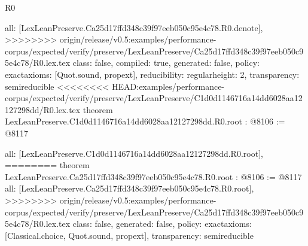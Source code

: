 \begin{lexlean}{R0}
\begin{coremodule}
{{{{{  all: [LexLeanPreserve.Ca25d17ffd348c39f97eeb050c95e4c78.R0.denote],
>>>>>>>> origin/release/v0.5:examples/performance-corpus/expected/verify/preserve/LexLeanPreserve/Ca25d17ffd348c39f97eeb050c95e4c78/R0.lex.tex
  class: false,
  compiled: true,
  generated: false,
  policy: exact{axioms: [Quot.sound, propext]},
  reducibility: regular{height: 2},
  transparency: semireducible
}
<<<<<<<< HEAD:examples/performance-corpus/expected/verify/preserve/LexLeanPreserve/C1d0d1146716a14dd6028aa12127298dd/R0.lex.tex
theorem LexLeanPreserve.C1d0d1146716a14dd6028aa12127298dd.R0.root : @8106 := @8117 {
  all: [LexLeanPreserve.C1d0d1146716a14dd6028aa12127298dd.R0.root],
========
theorem LexLeanPreserve.Ca25d17ffd348c39f97eeb050c95e4c78.R0.root : @8106 := @8117 {
  all: [LexLeanPreserve.Ca25d17ffd348c39f97eeb050c95e4c78.R0.root],
>>>>>>>> origin/release/v0.5:examples/performance-corpus/expected/verify/preserve/LexLeanPreserve/Ca25d17ffd348c39f97eeb050c95e4c78/R0.lex.tex
  class: false,
  generated: false,
  policy: exact{axioms: [Classical.choice, Quot.sound, propext]},
  transparency: semireducible
}

}}}}}
\end{coremodule}
\end{lexlean}
